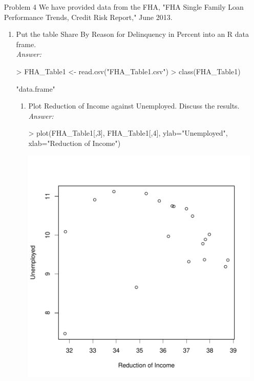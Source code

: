 \documentclass{article}
\begin{document}
\begin{enumerate}
	\item[Problem] 4 We have provided data from the FHA, "FHA Single Family Loan Performance Trends, Credit Risk Report," June 2013.
		\begin{enumerate}
			\item Put the table Share By Reason for Delinquency in Percent into an R data frame.\\
			\emph{Answer:}
\begin{Schunk}
\begin{Sinput}
> FHA_Table1 <- read.csv("FHA_Table1.csv")
> class(FHA_Table1)
\end{Sinput}
\begin{Soutput}
[1] "data.frame"
\end{Soutput}
\end{Schunk}
			\begin{enumerate}
				\item Plot Reduction of Income against Unemployed. Discuss the results.\\
				\emph{Answer:}
					\begin{center}
\begin{Schunk}
\begin{Sinput}
> plot(FHA_Table1[,3], FHA_Table1[,4], ylab="Unemployed", xlab="Reduction of Income")
\end{Sinput}
\end{Schunk}
\includegraphics{debseal_HW2-005}

\end{center}
\end{enumerate}
\end{enumerate}
\end{enumerate}
\end{document}
